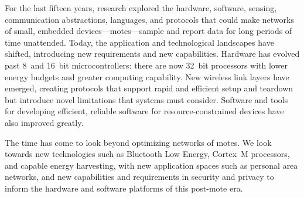 
For the last fifteen years, research explored the hardware, software, sensing,
communication abstractions, languages, and protocols that could make networks
of small, embedded devices---motes---sample and report data for long periods
of time unattended.
%
Today, the
application and technological landscapes have shifted, introducing new
requirements and new capabilities. Hardware has evolved past 8~and 16~bit
microcontrollers: there are now 32~bit processors with lower energy budgets
and greater computing capability. New wireless link layers have
emerged, creating protocols that support rapid and efficient setup and
teardown but introduce novel limitations that systems must consider.
Software and tools for developing efficient, reliable software for
resource-constrained devices have also improved greatly.

The time has come to look beyond optimizing networks of motes. We look towards
new technologies such as Bluetooth Low Energy, Cortex~M processors, and
capable energy harvesting, with new application spaces such as personal area
networks, and new capabilities and requirements in security and privacy to
inform the hardware and software platforms of this post-mote era.
\color{red}{*}

\marginparwidth=35pt
\marginpar{\color{red}{If we're proposing a platform, we should do it here!}}

